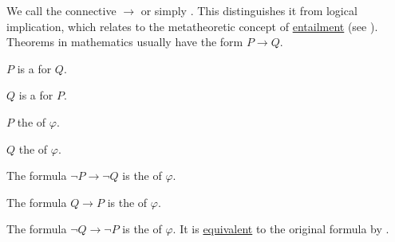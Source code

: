 \begin{definition}\label{def:material_implication}
  We call the connective \hyperref[def:propositional_language/connectives/implication]{\( \to \)}  or simply . This distinguishes it from logical implication, which relates to the metatheoretic concept of \hyperref[def:propositional_semantics/entailment]{entailment} (see \cite{MathSE:material_vs_logical_implication}). Theorems in mathematics usually have the form \( P \to Q \).

  \begin{thmenum}
     \( P \) is a  for \( Q \).

     \( Q \) is a  for \( P \).

     \( P \) the  of \( \varphi \).

     \( Q \) the  of \( \varphi \).

     The formula \( \neg P \to \neg Q \) is the  of \( \varphi \).

     The formula \( Q \to P \) is the  of \( \varphi \).

     The formula \( \neg Q \to \neg P \) is the  of \( \varphi \). It is \hyperref[def:propositional_semantics/equivalence]{equivalent} to the original formula by .
  \end{thmenum}
\end{definition}

